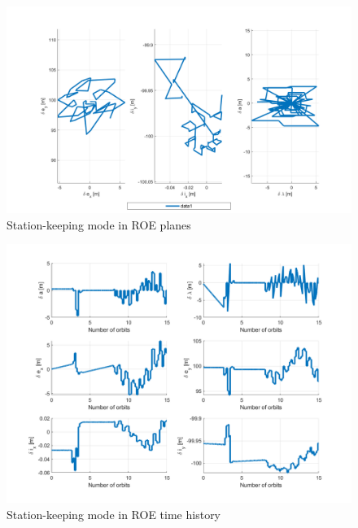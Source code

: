 \begin{figure}[H]
    \centering
    \includegraphics[width=0.7\linewidth]{sim/figures/PS5/ROE_planes.png}
    \caption{Station-keeping mode in ROE planes}
    \label{fig:roe_planes_stk}
\end{figure}

\begin{figure}[H]
    \centering
    \includegraphics[width=0.7\linewidth]{sim/figures/PS5/ROE_over_time.png}
    \caption{Station-keeping mode in ROE time history}
    \label{fig:roe_time_stk}
\end{figure}

